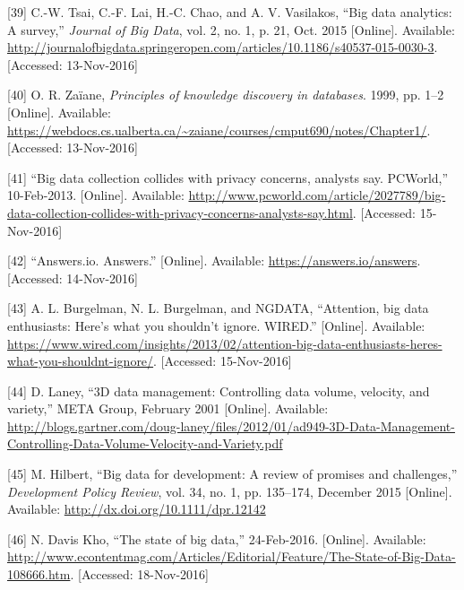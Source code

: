 \documentclass[12pt,english,a4paper,titlepage,cleardoublepage=empty,dottedtoc]{report}
\begin{document}
\hypertarget{ref-paper_2015_big-data-analytics_a-survey}{}
{[}39{]} C.-W. Tsai, C.-F. Lai, H.-C. Chao, and A. V. Vasilakos, ``Big
data analytics: A survey,'' \emph{Journal of Big Data}, vol. 2, no. 1,
p. 21, Oct. 2015 {[}Online{]}. Available:
\url{http://journalofbigdata.springeropen.com/articles/10.1186/s40537-015-0030-3}.
{[}Accessed: 13-Nov-2016{]}

\hypertarget{ref-book-chapter_1999_Principles-of-knowledge-discovery-in-databases_introduction-to-data-mining}{}
{[}40{]} O. R. Zaïane, \emph{Principles of knowledge discovery in
databases}. 1999, pp. 1--2 {[}Online{]}. Available:
\url{https://webdocs.cs.ualberta.ca/~zaiane/courses/cmput690/notes/Chapter1/}.
{[}Accessed: 13-Nov-2016{]}

\hypertarget{ref-web_2013_big-data-collection-collides-with-privacy-concerns}{}
{[}41{]} ``Big data collection collides with privacy concerns, analysts
say. PCWorld,'' 10-Feb-2013. {[}Online{]}. Available:
\url{http://www.pcworld.com/article/2027789/big-data-collection-collides-with-privacy-concerns-analysts-say.html}.
{[}Accessed: 15-Nov-2016{]}

\hypertarget{ref-web_2016_answers-io}{}
{[}42{]} ``Answers.io. Answers.'' {[}Online{]}. Available:
\url{https://answers.io/answers}. {[}Accessed: 14-Nov-2016{]}

\hypertarget{ref-web_2016_big-data-enthusiasts-should-not-ignore}{}
{[}43{]} A. L. Burgelman, N. L. Burgelman, and NGDATA, ``Attention, big
data enthusiasts: Here's what you shouldn't ignore. WIRED.''
{[}Online{]}. Available:
\url{https://www.wired.com/insights/2013/02/attention-big-data-enthusiasts-heres-what-you-shouldnt-ignore/}.
{[}Accessed: 15-Nov-2016{]}

\hypertarget{ref-report_2001_3d-data-management-controlling-data-volume-velocity-and-variety}{}
{[}44{]} D. Laney, ``3D data management: Controlling data volume,
velocity, and variety,'' META Group, February 2001 {[}Online{]}.
Available:
\url{http://blogs.gartner.com/doug-laney/files/2012/01/ad949-3D-Data-Management-Controlling-Data-Volume-Velocity-and-Variety.pdf}

\hypertarget{ref-paper_2015_big-data-for-development-a-review-of-promises-and-challenges:more-data}{}
{[}45{]} M. Hilbert, ``Big data for development: A review of promises
and challenges,'' \emph{Development Policy Review}, vol. 34, no. 1, pp.
135--174, December 2015 {[}Online{]}. Available:
\url{http://dx.doi.org/10.1111/dpr.12142}

\hypertarget{ref-web_2016_the-state-of-big-data}{}
{[}46{]} N. Davis Kho, ``The state of big data,'' 24-Feb-2016.
{[}Online{]}. Available:
\url{http://www.econtentmag.com/Articles/Editorial/Feature/The-State-of-Big-Data-108666.htm}.
{[}Accessed: 18-Nov-2016{]}
\end{document}
